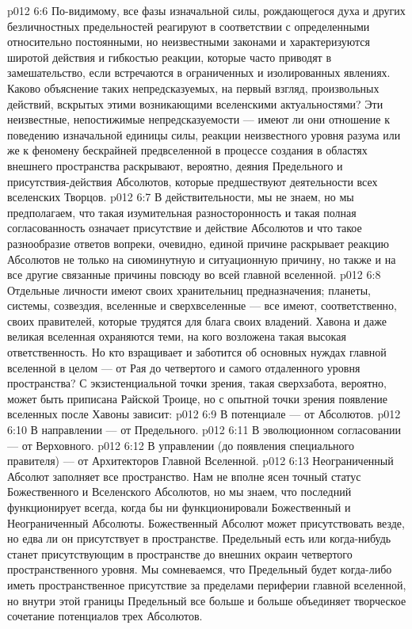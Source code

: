 \vs p012 6:6 \pc По\hyp{}видимому, все фазы изначальной силы, рождающегося духа и других безличностных предельностей реагируют в соответствии с определенными относительно постоянными, но неизвестными законами и характеризуются широтой действия и гибкостью реакции, которые часто приводят в замешательство, если встречаются в ограниченных и изолированных явлениях. Каково объяснение таких непредсказуемых, на первый взгляд, произвольных действий, вскрытых этими возникающими вселенскими актуальностями? Эти неизвестные, непостижимые непредсказуемости --- имеют ли они отношение к поведению изначальной единицы силы, реакции неизвестного уровня разума или же к феномену бескрайней предвселенной в процессе создания в областях внешнего пространства раскрывают, вероятно, деяния Предельного и присутствия\hyp{}действия Абсолютов, которые предшествуют деятельности всех вселенских Творцов.
\vs p012 6:7 В действительности, мы не знаем, но мы предполагаем, что такая изумительная разносторонность и такая полная согласованность означает присутствие и действие Абсолютов и что такое разнообразие ответов вопреки, очевидно, единой причине раскрывает реакцию Абсолютов не только на сиюминутную и ситуационную причину, но также и на все другие связанные причины повсюду во всей главной вселенной.
\vs p012 6:8 \pc Отдельные личности имеют своих хранительниц предназначения; планеты, системы, созвездия, вселенные и сверхвселенные --- все имеют, соответственно, своих правителей, которые трудятся для блага своих владений. Хавона и даже великая вселенная охраняются теми, на кого возложена такая высокая ответственность. Но кто взращивает и заботится об основных нуждах главной вселенной в целом --- от Рая до четвертого и самого отдаленного уровня пространства? С экзистенциальной точки зрения, такая сверхзабота, вероятно, может быть приписана Райской Троице, но с опытной точки зрения появление вселенных после Хавоны зависит:
\vs p012 6:9 \bibnobreakspace В потенциале --- от Абсолютов.
\vs p012 6:10 \bibnobreakspace В направлении --- от Предельного.
\vs p012 6:11 \bibnobreakspace В эволюционном согласовании --- от Верховного.
\vs p012 6:12 \bibnobreakspace В управлении (до появления специального правителя) --- от Архитекторов Главной Вселенной.
\vs p012 6:13 \pc Неограниченный Абсолют заполняет все пространство. Нам не вполне ясен точный статус Божественного и Вселенского Абсолютов, но мы знаем, что последний функционирует всегда, когда бы ни функционировали Божественный и Неограниченный Абсолюты. Божественный Абсолют может присутствовать везде, но едва ли он присутствует в пространстве. Предельный есть или когда\hyp{}нибудь станет присутствующим в пространстве до внешних окраин четвертого пространственного уровня. Мы сомневаемся, что Предельный будет когда\hyp{}либо иметь пространственное присутствие за пределами периферии главной вселенной, но внутри этой границы Предельный все больше и больше объединяет творческое сочетание потенциалов трех Абсолютов.
